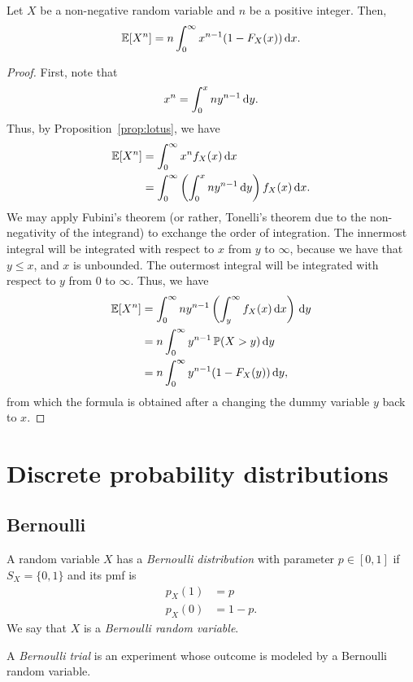 \begin{proposition}
  Let $X$ be a non-negative random variable and $n$ be a positive integer. Then, \[
    \E[X^{n}] = n \int_{0}^{\infty} x^{n-1} (1 - F_X(x)) \dl x.
  \] 
\end{proposition}
\begin{proof}
  First, note that \[
    x^{n} = \int_{0}^{x} ny^{n-1} \dl y.
  \] Thus, by Proposition~\ref{prop:lotus}, we have 
  \begin{align*}
    \E[X^n] &= \int_{0}^{\infty} x^n f_X (x) \dl x \\
            &= \int_{0}^{\infty} \left( \int_{0}^{x} ny^{n-1} \dl y \right) f_X(x) \dl x.
  \end{align*}
  We may apply Fubini's theorem (or rather, Tonelli's theorem due to the non-negativity of the integrand) to exchange the order of integration. The innermost integral will be integrated with respect to $x$ from $y$ to $\infty$, because we have that $y \le x$, and $x$ is unbounded. The outermost integral will be integrated with respect to $y$ from $0$ to $\infty$. Thus, we have 
  \begin{align*}
    \E[X^n] &= \int_{0}^{\infty} ny^{n-1} \left( \int_{y}^{\infty} f_X(x) \dl x \right) \dl y \\
            &= n\int_{0}^{\infty} y^{n-1} \prob(X > y) \dl y \\
            &= n \int_{0}^{\infty} y^{n-1} (1 - F_X(y)) \dl y,
  \end{align*}
  from which the formula is obtained after a changing the dummy variable $y$ back to $x$.
\end{proof}

\section{Discrete probability distributions}

\subsection{Bernoulli}

\begin{definition}
  A random variable $X$ has a \emph{Bernoulli distribution} with parameter $p \in [0, 1]$ if $S_X = \{0, 1\}$ and its pmf is
  \begin{align*}
    p_X(1) &= p \\
    p_X(0) &= 1 - p.
  \end{align*}
  We say that $X$ is a \emph{Bernoulli random variable}.

  A \emph{Bernoulli trial} is an experiment whose outcome is modeled by a Bernoulli random variable.
\end{definition}

